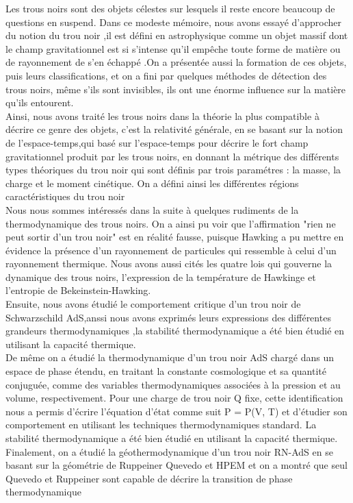  
Les trous noirs sont des objets célestes sur lesquels il reste encore beaucoup de questions en suspend. Dans ce modeste mémoire, nous avons essayé d'approcher du notion du trou noir ,il est défini en astrophysique  comme un objet massif dont le champ gravitationnel est si
s'intense qu'il empêche toute forme de matière ou de rayonnement de s'en échappé .On a présentée aussi la formation de ces objets, puis leurs classifications, et on a fini par quelques
méthodes de détection des trous noirs, même s'ils sont invisibles, ils ont une énorme influence sur la matière qu'ils entourent.\\
 Ainsi, nous avons traité les trous noirs dans la
théorie la plus compatible à décrire ce genre des objets, c'est la relativité générale, en se
basant sur la notion de l'espace-temps,qui basé sur  l’espace-temps pour décrire le fort champ gravitationnel produit
par les trous noirs, en donnant la métrique des différents types théoriques du trou noir qui sont
définis par trois paramétres : la masse, la charge et le moment cinétique. On a défini ainsi les
différentes régions caractéristiques du trou noir \\
Nous nous sommes intéressés dans la suite à quelques rudiments de la thermodynamique des
trous noirs. On a ainsi pu voir que l’affirmation "rien ne peut sortir d’un trou noir" est en réalité
fausse, puisque Hawking a pu mettre en évidence la présence d’un rayonnement de particules
qui ressemble à celui d'un rayonnement thermique. Nous avons aussi cités les quatre lois qui gouverne la dynamique des trous noirs, l’expression
de la température de Hawkinge et l’entropie de Bekeinstein-Hawking.\\
Ensuite, nous avons étudié le comportement critique d'un trou noir de Schwarzschild AdS,anssi nous avons exprimés leurs expressions des
différentes grandeurs thermodynamiques ,la stabilité thermodynamique a été bien étudié en utilisant la capacité thermique.\\
De m\^{e}me on a étudié la thermodynamique d’un trou noir AdS chargé dans un espace de phase
étendu, en traitant la constante cosmologique et sa quantité conjuguée, comme des variables thermodynamiques associées à la pression et au volume, respectivement. Pour une
charge de trou noir Q fixe, cette identification nous a permis d’écrire l’équation d’état
comme suit P = P(V, T) et d’étudier son comportement en utilisant les techniques thermodynamiques standard. La stabilité thermodynamique a été bien étudié en utilisant la
capacité thermique.
Finalement, on a étudié la géothermodynamique d’un trou noir RN-AdS en se basant
sur la géométrie de Ruppeiner Quevedo et HPEM et on a montré que seul Quevedo et
Ruppeiner sont capable de décrire la transition de phase thermodynamique
